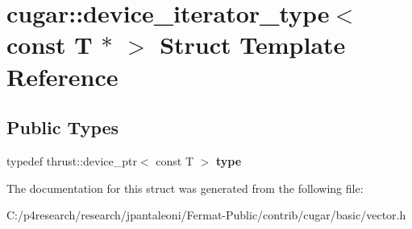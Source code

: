 \hypertarget{structcugar_1_1device__iterator__type_3_01const_01_t_01_5_01_4}{}\section{cugar\+:\+:device\+\_\+iterator\+\_\+type$<$ const T $\ast$ $>$ Struct Template Reference}
\label{structcugar_1_1device__iterator__type_3_01const_01_t_01_5_01_4}
\subsection*{Public Types}
\begin{DoxyCompactItemize}
\item 
typedef thrust\+::device\+\_\+ptr$<$ const T $>$ {\bfseries type}
\end{DoxyCompactItemize}


The documentation for this struct was generated from the following file\+:\begin{DoxyCompactItemize}
\item 
C\+:/p4research/research/jpantaleoni/\+Fermat-\/\+Public/contrib/cugar/basic/vector.\+h\end{DoxyCompactItemize}
